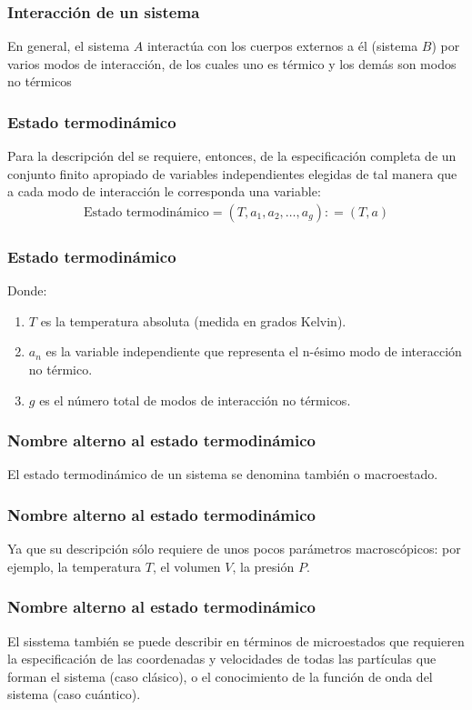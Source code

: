 \documentclass[12pt]{beamer}
\begin{document}
\begin{frame}
\frametitle{Interacción de un sistema}
En general, el sistema $A$ interactúa con los cuerpos externos a él (sistema $B$) por varios modos de interacción, de los cuales uno es térmico y los demás son modos no térmicos
\end{frame}
\begin{frame}
\frametitle{Estado termodinámico}
Para la descripción del  se requiere, entonces, de la especificación completa de un conjunto finito apropiado de variables independientes elegidas de tal manera que a cada modo de interacción le corresponda una variable:
\begin{align}
\text{Estado termodinámico} = (T, a_{1}, a_{2}, \ldots, a_{g}) : =(T, a)
\label{eq:ecuacion_01_01}
\end{align}
\end{frame}
\begin{frame}
\frametitle{Estado termodinámico}
Donde:
\begin{enumerate}[<+->]
\item $T$ es la temperatura absoluta (medida en grados Kelvin).
\item $a_{n}$ es la variable independiente que representa el n-ésimo modo de interacción no térmico.
\item $g$ es el número total de modos de interacción no térmicos.
\end{enumerate}
\end{frame}
\begin{frame}
\frametitle{Nombre alterno al estado termodinámico}
El estado termodinámico de un sistema se denomina también  o \textcolor{rossocorsa}{macroestado}.
\end{frame}
\begin{frame}
\frametitle{Nombre alterno al estado termodinámico}
Ya que su descripción sólo requiere de unos pocos parámetros macroscópicos: \pause por ejemplo, la temperatura $T$, el volumen $V$, la presión $P$.
\end{frame}
\begin{frame}
\frametitle{Nombre alterno al estado termodinámico}
El sisstema también se puede describir en términos de \textcolor{sangria}{microestados} que requieren la especificación de las coordenadas y velocidades de todas las partículas que forman el sistema (caso clásico), \pause o el conocimiento
de la función de onda del sistema (caso cuántico).
\end{frame}
\end{document}
